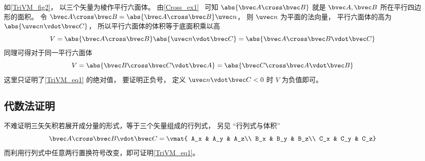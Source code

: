 如\autoref{TriVM_fig2}， 以三个矢量为棱作平行六面体。 由\autoref{Cross_ex1}~ 可知 $\abs{\bvec A \cross \bvec B}$ 就是 $\bvec A,\bvec B$ 所在平行四边形的面积。 令 $\bvec A \cross \bvec B = \abs{\bvec A \cross \bvec B} \uvec n$， 则 $\uvec n$ 为平面的法向量， 平行六面体的高为 $\abs{\uvec n \vdot \bvec C}$， 所以平行六面体的体积等于底面积乘以高
\begin{equation}
V = \abs{\bvec A \cross \bvec B} \abs{\uvec n \vdot \bvec C} = \abs{\bvec A \cross \bvec B \vdot \bvec C}
\end{equation}
同理可得对于同一平行六面体
\begin{equation}
V = \abs{\bvec B \cross \bvec C \vdot \bvec A} = \abs{\bvec C \cross \bvec A \vdot \bvec B} 
\end{equation}  
这里只证明了\autoref{TriVM_eq1} 的绝对值， 要证明正负号， 定义 $\uvec n \vdot \bvec C < 0$ 时 $V$ 为负值即可。

\subsection{代数法证明}
不难证明三矢矢积若展开成分量的形式，等于三个矢量组成的行列式， 另见 “行列式与体积”
\begin{equation}
\bvec A \cross \bvec B \vdot \bvec C = \vmat{
A_x & A_y & A_z\\
B_x & B_y & B_z\\
C_x & C_y & C_z}
\end{equation}
而利用行列式中任意两行置换符号改变，即可证明\autoref{TriVM_eq1}。
